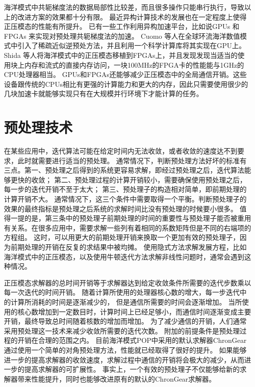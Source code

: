  

海洋模式中共轭梯度法的数据局部性比较差，而且很多操作只能串行执行，导致以上的改进方案的效果都十分有限。
最近异构计算技术的发展也在一定程度上使得正压模态的性能有所提升。 
已有一些工作利用异构加速平台，比如说GPUs \cite{cuomo2012pcg} 和FPGAs \cite{Shida2007}来实现对预处理共轭梯度法的加速。 
Cuomo 等人\cite{cuomo2012pcg}在全球环流海洋数值模式中引入了稀疏近似逆预处方法，并且利用一个科学计算库将其实现在GPU上。 
Shida 等人\cite{Shida2007}将海洋模式中的正压模态移植到FPGAs上，并且发现发现当适当的使用块上内存和流式的直接内存访问，一块100MHz的FPGA卡的性能能与1GHz的CPU处理器相当。 
GPUs和FPGAs还能够减少正压模态中的全局通信开销。这些设备跟传统的CPUs相比有更强的计算能力和更大的内存，因此只需要使用很少的几块加速卡就能够实现只有在大规模并行环境下才能计算的任务。 


\section{预处理技术}
\label{related:precond}
在某些应用中，迭代算法可能在给定时间内无法收敛，或者收敛的速度达不到要求，此时就需要进行适当的预处理。
通常情况下，判断预处理方法好坏的标准有三点。第一、预处理之后得到的系统更容易求解，即经过预处理之后，迭代算法能够更快的收敛； 第二、预处理过程的计算开销较小，需要确保使用预处理之后，每一步的迭代开销不至于太大； 第三、预处理子的构造相对简单，即前期处理的计算开销不大。 
通常情况下，这三个条件中需要取得一个平衡。判断预处理子的效果的最终指标是预处理之后系统的求解时间比没有预处理的时候要小很多。 
值得一提的是，第三条中的预处理子前期处理的时间的重要性与预处理子能否被重用有关系。在很多应用中，需要求解一些列有着相同的系数矩阵但是不同的右端项的方程组。
这时，可以用更大的前期处理开销来换取一个更加有效的预处理子，因为前期处理的开销在反复的求结果中被均摊。 
使用隐式方法求解发展方程，比如海洋模式中的正压模态，以及使用牛顿迭代方法求解非线性问题时，通常会遇到这种情况\cite{benzi2002preconditioning}。

正压模态求解器的总时间开销等于求解器达到给定收敛条件所需要的迭代步数乘以每一次迭代的时间开销。
随着计算所使用的处理器核心数的增大，每一步迭代中的计算所消耗的时间是逐渐减少的，
但是通信所需要的时间会逐渐增加。 
当所使用的核心数增加到一定数目时，计算时间上已经足够小，而通信时间逐渐变成主要开销，最终导致总时间随着核数的增加而增加。 
为了减少通信的开销，人们通常采用预处理这一技术来减少收敛所需要的迭代次数。
附加的前提条件是预处理过程的开销在合理的范围之内。 
目前海洋模式POP中采用的默认求解器ChronGear通过使用一个简单的对角预处理方法，性能就已经取得了很好的提升\cite{pini1990simple, reddy2013comparison}。 
如果能够进一步的提高求解器的收敛速度，求解过程中通信的开销将会极大的减少，从而进一步的提高求解器的可扩展性。
事实上，一个有效的预处理子不仅能够给新的求解器带来性能提升，同时也能够改进原有的默认的ChronGear求解器。



